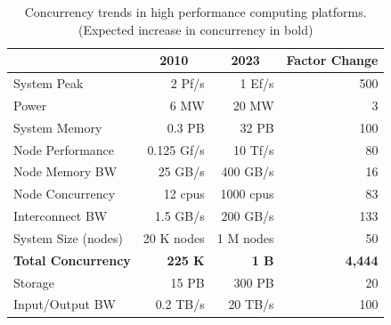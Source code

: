 \begin{table}[!htb]
\centering
\begin{tabular}{|l|r|r|r|}
\hline
                    & \multicolumn{1}{c|}{\textbf{2010}} & \multicolumn{1}{c|}{\textbf{2023}} & \multicolumn{1}{c|}{\textbf{Factor Change}} \\ \hline \hline
System Peak         & 2 Pf/s                             & 1 Ef/s                             & 500                                         \\ \hline
Power               & 6 MW                               & 20 MW                              & 3                                           \\ \hline
System Memory       & 0.3 PB                             & 32 PB                              & 100                                         \\ \hline
Node Performance    & 0.125 Gf/s                         & 10 Tf/s                            & 80                                          \\ \hline
Node Memory BW      & 25 GB/s                            & 400 GB/s                           & 16                                          \\ \hline
Node Concurrency    & 12 cpus                            & 1000 cpus                          & 83                                          \\ \hline
Interconnect BW     & 1.5 GB/s                           & 200 GB/s                           & 133                                         \\ \hline
System Size (nodes) & 20 K nodes                         & 1 M nodes                          & 50                                          \\ \hline
\textbf{Total Concurrency}   & \textbf{225 K}                              & \textbf{1 B}                                & \textbf{4,444}                                       \\ \hline
Storage             & 15 PB                              & 300 PB                             & 20                                          \\ \hline
Input/Output BW     & 0.2 TB/s                           & 20 TB/s                            & 100                                         \\ \hline
\end{tabular}
\label{tab:trends}
\caption{Concurrency trends in high performance computing platforms. (Expected increase in concurrency in bold)}
\end{table}

